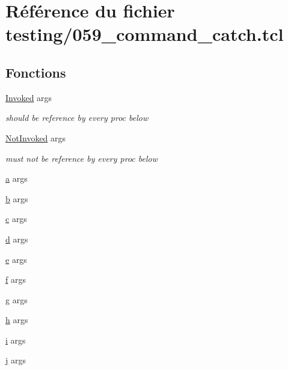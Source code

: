 \hypertarget{059__command__catch_8tcl}{}\section{Référence du fichier testing/059\+\_\+command\+\_\+catch.tcl}
\label{059__command__catch_8tcl}
\subsection*{Fonctions}
\begin{DoxyCompactItemize}
\item 
\hyperlink{059__command__catch_8tcl_aa889853547f65a22ae133cd57ff89601}{Invoked} args
\begin{DoxyCompactList}\small\item\em should be reference by every proc below \end{DoxyCompactList}\item 
\hyperlink{059__command__catch_8tcl_a3f55465410c57ed00ab28827a741b1c3}{Not\+Invoked} args
\begin{DoxyCompactList}\small\item\em must not be reference by every proc below \end{DoxyCompactList}\item 
\hyperlink{059__command__catch_8tcl_ab08ae027fc5777bc4f0629f1b60b35db}{a} args
\item 
\hyperlink{059__command__catch_8tcl_a68bdb74c144118d936931c46f75d4b3e}{b} args
\item 
\hyperlink{059__command__catch_8tcl_ab14f56bc3bd7680490ece4ad7815465f}{c} args
\item 
\hyperlink{059__command__catch_8tcl_af43f4b1f0064a33b2d662af9f06d3a00}{d} args
\item 
\hyperlink{059__command__catch_8tcl_aff65a51a703804e0ad1adbcfd76c86f8}{e} args
\item 
\hyperlink{059__command__catch_8tcl_af6830d2c644b45088ea8f1f74a46b778}{f} args
\item 
\hyperlink{059__command__catch_8tcl_af08b4b5bfa9edf0b0a7dee1c2b2c29e0}{g} args
\item 
\hyperlink{059__command__catch_8tcl_af96fd0966e32a310a0778d2e5c357700}{h} args
\item 
\hyperlink{059__command__catch_8tcl_a8c90afd4641b25be86bd09983c3cbee0}{i} args
\item 
\hyperlink{059__command__catch_8tcl_a2aaa92757686acea102cba3475f0c13b}{j} args
\end{DoxyCompactItemize}



